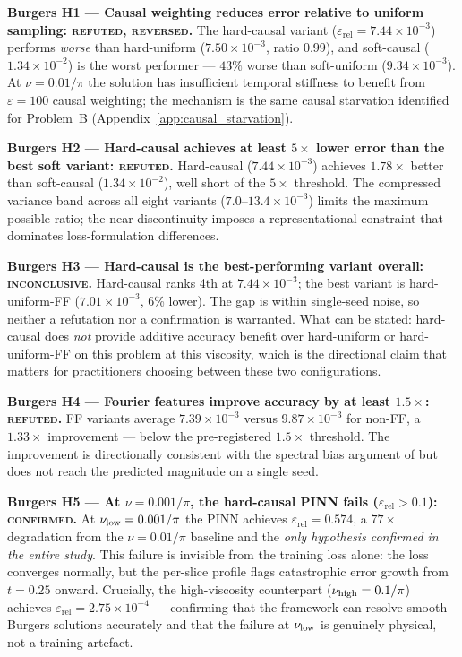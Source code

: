 \documentclass{article}
\newcommand{\relL}{\varepsilon_{\mathrm{rel}}}
\begin{document}
\textbf{Burgers H1 — Causal weighting reduces error relative to uniform sampling:
\textsc{refuted, reversed}.}
The hard-causal variant ($\relL=7.44\times10^{-3}$) performs \emph{worse}
than hard-uniform ($7.50\times10^{-3}$, ratio $0.99$), and soft-causal
($1.34\times10^{-2}$) is the worst performer — $43\%$ worse than soft-uniform
($9.34\times10^{-3}$).
At $\nu=0.01/\pi$ the solution has insufficient temporal stiffness to
benefit from $\varepsilon=100$ causal weighting; the mechanism is the same
causal starvation identified for Problem~B
(Appendix~\ref{app:causal_starvation}).

\textbf{Burgers H2 — Hard-causal achieves at least $5\times$ lower error than the
best soft variant: \textsc{refuted}.}
Hard-causal ($7.44\times10^{-3}$) achieves $1.78\times$ better than soft-causal
($1.34\times10^{-2}$), well short of the $5\times$ threshold.
The compressed variance band across all eight variants ($7.0\text{--}13.4\times10^{-3}$)
limits the maximum possible ratio; the near-discontinuity imposes a
representational constraint that dominates loss-formulation differences.

\textbf{Burgers H3 — Hard-causal is the best-performing variant overall:
\textsc{inconclusive}.}
Hard-causal ranks 4th at $7.44\times10^{-3}$; the best variant is
hard-uniform-FF ($7.01\times10^{-3}$, 6\% lower).
The gap is within single-seed noise, so neither a refutation nor a
confirmation is warranted.
What can be stated: hard-causal does \emph{not} provide additive accuracy
benefit over hard-uniform or hard-uniform-FF on this problem at this viscosity,
which is the directional claim that matters for practitioners choosing between
these two configurations.

\textbf{Burgers H4 — Fourier features improve accuracy by at least $1.5\times$:
\textsc{refuted}.}
FF variants average $7.39\times10^{-3}$ versus $9.87\times10^{-3}$ for non-FF,
a $1.33\times$ improvement — below the pre-registered $1.5\times$ threshold.
The improvement is directionally consistent with the spectral bias argument
of \citet{tancik2020ff} but does not reach the predicted magnitude on a
single seed.

\textbf{Burgers H5 — At $\nu=0.001/\pi$, the hard-causal PINN fails ($\relL > 0.1$):
\textsc{confirmed}.}
At $\nu_{\rm low}=0.001/\pi$ the PINN achieves $\relL=0.574$, a $77\times$
degradation from the $\nu=0.01/\pi$ baseline and the \emph{only hypothesis
confirmed in the entire study}.
This failure is invisible from the training loss alone: the loss converges
normally, but the per-slice profile flags catastrophic error growth from
$t=0.25$ onward.
Crucially, the high-viscosity counterpart ($\nu_{\rm high}=0.1/\pi$) achieves
$\relL=2.75\times10^{-4}$ — confirming that the framework can resolve smooth
Burgers solutions accurately and that the failure at $\nu_{\rm low}$ is
genuinely physical, not a training artefact.
\end{document}
